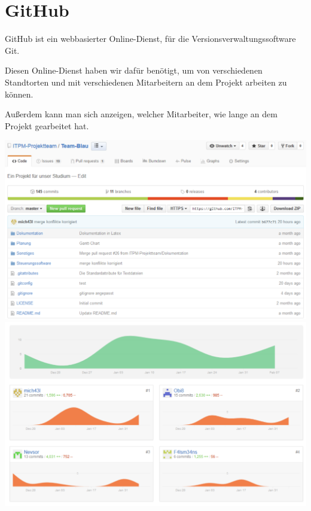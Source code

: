 \section{GitHub}
GitHub ist ein webbasierter Online-Dienst, für die Versionsverwaltungssoftware Git.

Diesen Online-Dienst haben wir dafür benötigt, um von verschiedenen Standtorten und mit verschiedenen Mitarbeitern an dem Projekt arbeiten zu können.

Außerdem kann man sich anzeigen, welcher Mitarbeiter, wie lange an dem Projekt gearbeitet hat.
\begin{center}
	\includegraphics[width=1\textwidth]{Bilder/Github.pdf}
	\includegraphics[width=1\textwidth]{Bilder/GitHub_Mitarbeiter_Dauer.pdf}
\end{center}
